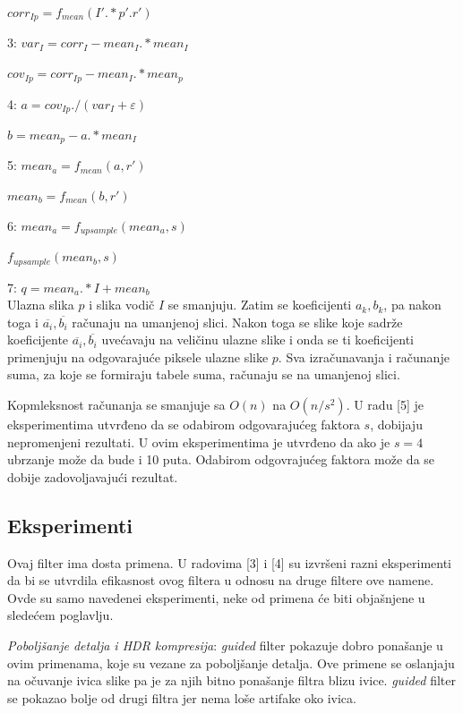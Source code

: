 \documentclass[a4paper,12pt,titlepage]{article}
\begin{document}
\hspace{4mm} $corr_{Ip} = f_{mean}(I' .* p'. r')$

3: $var_I = corr_I - mean_I .* mean_I$

\hspace{4mm}  $cov_{Ip} = corr_{Ip} - mean_I .* mean_p$

4: $a = cov_{Ip} ./ (var_I + \varepsilon)$

\hspace{4mm} $b = mean_p - a .*  mean_I$

5: $mean_a = f_{mean}(a, r')$

\hspace{4mm} $mean_b = f_{mean}(b, r')$

6: $mean_a = f_{upsample}(mean_a, s)$

\hspace{4mm} $f_{upsample}(mean_b, s)$

7: $q = mean_a .* I + mean_b$\\

Ulazna slika $p$ i slika vodič $I$ se smanjuju. Zatim se koeficijenti $a_k, b_k$, pa nakon toga i $\overline{a_i}, \overline{b_i}$ računaju na umanjenoj slici. Nakon toga se slike koje sadrže koeficijente $\overline{a_i}, \overline{b_i}$ uvećavaju na veličinu ulazne slike i onda se ti koeficijenti primenjuju na odgovarajuće piksele ulazne slike $p$. Sva izračunavanja i računanje suma, za koje se formiraju tabele suma, računaju se na umanjenoj slici.

Kopmleksnost računanja se smanjuje sa $O(n)$ na $O(n / s^2)$. U radu [5] je eksperimentima utvrđeno da se odabirom odgovarajućeg faktora $s$, dobijaju nepromenjeni rezultati. U ovim eksperimentima je utvrđeno da ako je $s = 4$ ubrzanje može da bude i 10 puta. Odabirom odgovrajućeg faktora može da se dobije zadovoljavajući rezultat.   

\subsection{Eksperimenti}%

Ovaj filter ima dosta primena. U radovima [3] i [4] su izvršeni razni eksperimenti da bi se utvrdila efikasnost ovog filtera u odnosu na druge filtere ove namene. Ovde su samo navedenei eksperimenti, neke od primena će biti objašnjene u sledećem poglavlju. 

\emph{Poboljšanje detalja i HDR kompresija}: \emph{guided}  filter pokazuje dobro ponašanje u ovim primenama, koje su vezane za poboljšanje detalja. Ove primene se oslanjaju na očuvanje ivica slike pa je za njih bitno ponašanje filtra blizu ivice. \emph{guided} filter se pokazao bolje od drugi filtra jer nema loše artifake oko ivica. 
\end{document}

